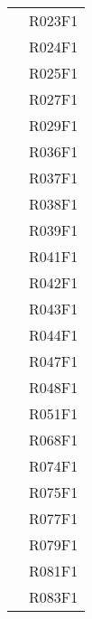 \documentclass[../analisi-dei-requisiti.tex]{subfiles}
\begin{document}
\begin{longtable}[H]{>{\centering}m{5cm} >{\centering}m{5cm}}
                                & R023F1                               \\
                                & R024F1                               \\
                                & R025F1                               \\
                                & R027F1                               \\
                                & R029F1                               \\
                                & R036F1                               \\
                                & R037F1                               \\
                                & R038F1                               \\
                                & R039F1                               \\
                                & R041F1                               \\
                                & R042F1                               \\
                                & R043F1                               \\
                                & R044F1                               \\
                                & R047F1                               \\
                                & R048F1                               \\
                                & R051F1                               \\
                                & R068F1                               \\
                                & R074F1                               \\
                                & R075F1                               \\
                                & R077F1                               \\
                                & R079F1                               \\
                                & R081F1                               \\
                                & R083F1                               \\

\end{longtable}
\end{document}
